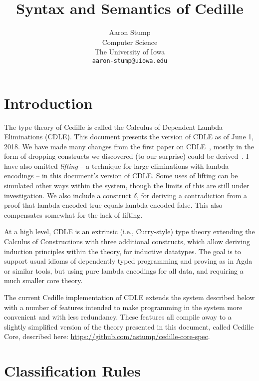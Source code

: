 \documentclass{article}
\begin{document}
\title{Syntax and Semantics of Cedille}

\author{Aaron Stump \\
  Computer Science \\
  The University of Iowa \\
\texttt{aaron-stump@uiowa.edu}}

\date{}

\maketitle

\section{Introduction}

The type theory of Cedille is called the Calculus of Dependent Lambda
Eliminations (CDLE).  This document presents the version of CDLE as of
June 1, 2018.  We have made many changes from the first paper on CDLE~\cite{stump17},
mostly in the form of dropping constructs we discovered (to our
surprise) could be derived~\cite{stump18}. I have also omitted
\emph{lifting} -- a technique for large eliminations with lambda
encodings -- in this document's version of CDLE.  Some uses of lifting
can be simulated other ways within the system, though the limits of
this are still under investigation.  We also include a construct
$\delta$, for deriving a contradiction from a proof that
lambda-encoded true equals lambda-encoded false.  This also
compensates somewhat for the lack of lifting.

At a high level, CDLE is an extrinsic (i.e., Curry-style) type theory
extending the Calculus of Constructions with three additional
constructs, which allow deriving induction principles within the
theory, for inductive datatypes.  The goal is to support usual
idioms of dependently typed programming and proving as in Agda or
similar tools, but using pure lambda encodings for all data, and
requiring a much smaller core theory.

The current Cedille implementation of CDLE extends the system
described below with a number of features intended to make programming
in the system more convenient and with less redundancy.  These
features all compile away to a slightly simplified version of the
theory presented in this document, called Cedille Core, described
here: \url{https://github.com/astump/cedille-core-spec}.

\section{Classification Rules}
\end{document}
